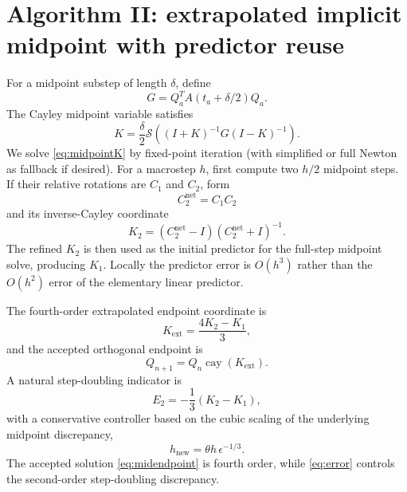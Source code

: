 \documentclass[11pt]{article}
\newcommand{\Sop}{\mathcal{S}}
\newcommand{\cay}{\operatorname{cay}}
\begin{document}
\section{Algorithm II: extrapolated implicit midpoint with predictor reuse}
For a midpoint substep of length $\delta$, define
\begin{equation}
 G=Q_a^T A(t_a+\delta/2)Q_a.
 \label{eq:midG}
\end{equation}
The Cayley midpoint variable satisfies
\begin{equation}
 \boxed{K=\frac{\delta}{2}\Sop\left((I+K)^{-1}G(I-K)^{-1}\right)}.
 \label{eq:midpointK}
\end{equation}
We solve \eqref{eq:midpointK} by fixed-point iteration (with simplified or full Newton as fallback if desired). For a macrostep $h$, first compute two $h/2$ midpoint steps. If their relative rotations are $C_1$ and $C_2$, form
\begin{equation}
 C_2^{\mathrm{net}}=C_1C_2
 \label{eq:netC}
\end{equation}
and its inverse-Cayley coordinate
\begin{equation}
 K_2=(C_2^{\mathrm{net}}-I)(C_2^{\mathrm{net}}+I)^{-1}.
 \label{eq:K2}
\end{equation}
The refined $K_2$ is then used as the initial predictor for the full-step midpoint solve, producing $K_1$. Locally the predictor error is $O(h^3)$ rather than the $O(h^2)$ error of the elementary linear predictor.

The fourth-order extrapolated endpoint coordinate is
\begin{equation}
 \boxed{K_{\mathrm{ext}}=\frac{4K_2-K_1}{3}},
 \label{eq:richardson}
\end{equation}
and the accepted orthogonal endpoint is
\begin{equation}
 \boxed{Q_{n+1}=Q_n\cay(K_{\mathrm{ext}})}.
 \label{eq:midendpoint}
\end{equation}
A natural step-doubling indicator is
\begin{equation}
 E_2=-\frac13(K_2-K_1),
 \label{eq:error}
\end{equation}
with a conservative controller based on the cubic scaling of the underlying midpoint discrepancy,
\begin{equation}
 h_{\mathrm{new}}=\theta h\,\epsilon^{-1/3}.
 \label{eq:controller}
\end{equation}
The accepted solution \eqref{eq:midendpoint} is fourth order, while \eqref{eq:error} controls the second-order step-doubling discrepancy.
\end{document}
